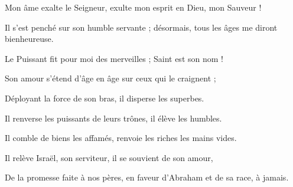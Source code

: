 \item Mon âme exalte le Seigneur,
exulte mon esprit en Dieu, mon Sauveur !

\item  Il s'est penché sur son humble servante ;
désormais, tous les âges me diront bienheureuse.

\item Le Puissant fit pour moi des merveilles ;
Saint est son nom !

\item Son amour s'étend d'âge en âge
sur ceux qui le craignent ;

\item Déployant la force de son bras,
il disperse les superbes.

\item Il renverse les puissants de leurs trônes,
il élève les humbles.

\item Il comble de biens les affamés,
renvoie les riches les mains vides.

\item Il relève Israël, son serviteur,
il se souvient de son amour,

\item De la promesse faite à nos pères,
en faveur d'Abraham et de sa race, à jamais.